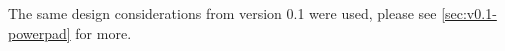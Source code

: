 The same design considerations from version 0.1 were used, please see \autoref{sec:v0.1-powerpad} for more.